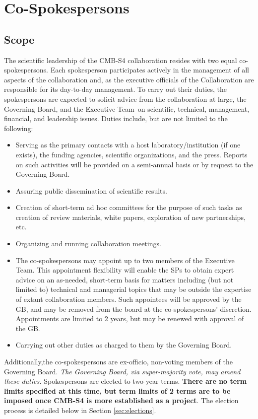 \documentclass[12pt]{article}
\newcommand{\exec}{{Executive Team}}
\begin{document}
\section{Co-Spokespersons}
\label{sec:spokes}

\subsection{Scope}

The	scientific leadership of the CMB-S4 collaboration resides with two equal co-spokespersons.			
Each spokesperson participates actively in the management of all aspects of the	collaboration and, as the executive officials of the Collaboration are responsible for its day-to-day management. 
To carry out their duties, the spokespersons are expected to solicit advice from the collaboration at large, the Governing Board, and the	
\exec \ on scientific, technical, management, financial, and leadership issues.  
Duties include, but are not limited to the following: 
\begin{itemize}
\item Serving as the primary contacts with a  host laboratory/institution (if one exists), the funding agencies, scientific organizations, and the press. Reports on such activities will be provided on a semi-annual basis or by request to the Governing Board.
\item Assuring public dissemination of scientific results. 
\item Creation of short-term ad hoc committees for the purpose of such tasks as creation of review materials, white papers, exploration of new partnerships, etc.
\item Organizing and running collaboration meetings. 
\item The co-spokespersons may appoint up to two members of the \exec. This appointment flexibility will enable the SPs to obtain expert advice on an as-needed, short-term basis for matters including (but not limited to) technical and managerial topics that may be outside the expertise of extant collaboration members. Such appointees will be approved by the GB, 
and may be removed from the board at the co-spokespersons' discretion. Appointments are limited to 2 years, but may be renewed with approval of the GB. 
\item Carrying out other duties as charged to them by the Governing Board.


\end{itemize}
Additionally,the co-spokespersons are ex-officio, non-voting members of the Governing Board.  \textit{The Governing Board, via super-majority vote, may amend these duties.} 
Spokespersons are elected to two-year terms. \textbf{There are no term limits specified at this time, but term limits of 2 terms are to be imposed once CMB-S4 is more established as a project}. The election process is detailed below in Section \ref{sec:elections}. 
\end{document}
